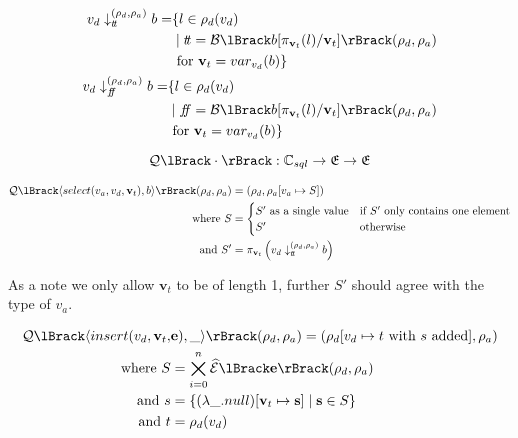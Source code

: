 \begin{align}
    \begin{split}
        v_d \downarrow_{\true}^{(\rho_d, \rho_a)} b = &\{ l \in \rho_d(v_d) \\
        &\mid \true = \boolsem{b[\pi_{\mathbf{v}_t}(l)/\mathbf{v}_t]}(\rho_d, \rho_a) \\
        &\text{ for } \mathbf{v}_t = var_{v_d}(b) \}
    \end{split}\\
    \begin{split}
        v_d \downarrow_{\false}^{(\rho_d, \rho_a)} b = &\{ l \in \rho_d(v_d) \\
        &\mid \false = \boolsem{b[\pi_{\mathbf{v}_t}(l)/\mathbf{v}_t]}(\rho_d, \rho_a) \\
        &\text{ for } \mathbf{v}_t = var_{v_d}(b) \}
    \end{split}\\
\end{align}

\begin{equation}
    \sqlsem{\cdot} : \mathbb{C}_{sql} \rightarrow \environments \rightarrow \environments
\end{equation}

\begin{align}
    \sqlsem{\langle select(v_a, v_d, \mathbf{v}_t), b \rangle}(\rho_d, \rho_a) &= (\rho_d, \rho_a[v_a \mapsto S]) \\
    \text{where } S &= \begin{cases}
        S' \text{ as a single value} & \text{if $S'$ only contains one element} \\
        S' & \text{otherwise}
    \end{cases}\\
    \text{and } S' &= \pi_{\mathbf{v}_t} \left( v_d \downarrow_{\true}^{(\rho_d, \rho_a)} b \right)
\end{align}

As a note we only allow $\mathbf{v}_t$ to be of length 1, further $S'$ should agree with the type of $v_a$.

\begin{align}
    \sqlsem{\langle insert(v_d, \mathbf{v}_t, &\mathbf{e}), \_ \rangle}(\rho_d, \rho_a) = (\rho_d[v_d\mapsto t \text{ with $s$ added}], \rho_a) \\
    \text{where } S &= \bigtimes_{i = 0}^{n} \absexpsem{\mathbf{e}}(\rho_d, \rho_a) \\
    \text{and } s &= \left\{ (\lambda\_.\mnull)[\mathbf{v}_t \mapsto \mathbf{s}] \;\middle|\; \mathbf{s} \in S\right\} \nonumber\\
    \text{and } t &= \rho_d(v_d)
\end{align}

